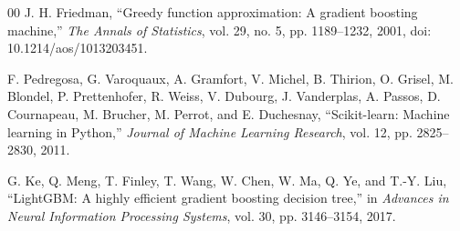 \documentclass[conference]{IEEEtran}
\begin{document}
\begin{thebibliography}{00}
J. H. Friedman, ``Greedy function approximation: A gradient boosting
machine,'' \textit{The Annals of Statistics}, vol. 29, no. 5,
pp. 1189--1232, 2001, doi: 10.1214/aos/1013203451.

F. Pedregosa, G. Varoquaux, A. Gramfort, V. Michel, B. Thirion, O. Grisel,
M. Blondel, P. Prettenhofer, R. Weiss, V. Dubourg, J. Vanderplas, A. Passos,
D. Cournapeau, M. Brucher, M. Perrot, and E. Duchesnay, ``Scikit-learn:
Machine learning in Python,'' \textit{Journal of Machine Learning Research},
vol. 12, pp. 2825--2830, 2011.

G. Ke, Q. Meng, T. Finley, T. Wang, W. Chen, W. Ma, Q. Ye, and T.-Y. Liu,
``LightGBM: A highly efficient gradient boosting decision tree,'' in
\textit{Advances in Neural Information Processing Systems}, vol. 30,
pp. 3146--3154, 2017.

\end{thebibliography}
\end{document}
